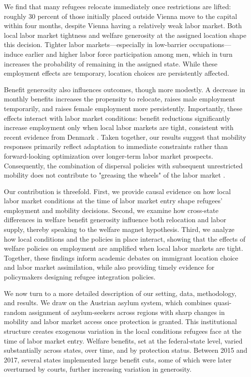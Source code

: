 We find that many refugees relocate immediately once restrictions are lifted: roughly 30 percent of those initially placed outside Vienna move to the capital within four months, despite Vienna having a relatively weak labor market. Both local labor market tightness and welfare generosity at the assigned location shape this decision. Tighter labor markets—especially in low-barrier occupations—induce earlier and higher labor force participation among men, which in turn increases the probability of remaining in the assigned state. While these employment effects are temporary, location choices are persistently affected.

Benefit generosity also influences outcomes, though more modestly. A decrease in monthly benefits increases the propensity to relocate, raises male employment temporarily, and raises female employment more persistently. Importantly, these effects interact with labor market conditions: benefit reductions significantly increase employment only when local labor markets are tight, consistent with recent evidence from Denmark \citep{dustmann2024}. Taken together, our results suggest that mobility responses primarily reflect adaptation to immediate constraints rather than forward-looking optimization over longer-term labor market prospects. Consequently, the combination of dispersal policies with subsequent unrestricted mobility does not contribute to "greasing the wheels" of the labor market \citep{borjas2001}.

Our contribution is threefold. First, we provide causal evidence on how local labor market conditions at the time of labor market entry shape refugees’ employment and mobility decisions. Second, we examine how cross-state differences in welfare benefit generosity influence both relocation and labor supply, thereby speaking to the welfare magnet hypothesis. Third, we analyze how local conditions and the policies in place interact, showing that the effects of welfare policies on employment are amplified when local labor markets are tight. Together, these findings inform academic debates on immigrant location choice and labor market assimilation, while also providing timely evidence for policymakers designing refugee integration policies.

We now turn to a more detailed description of our setting, data, methodology, and results. We draw on the Austrian asylum system, which combines quasi-random assignment of asylum-seekers across regions with sharp changes in mobility and labor market access once protection is granted. This institutional structure creates exogenous variation in the local conditions refugees face at the time of labor market entry. Welfare benefits, set at the federal-state level, varied substantially across states, over time, and by protection status. Between 2015 and 2017, several states implemented large benefit cuts, some of which were later overturned by courts, further increasing variation in generosity. 

